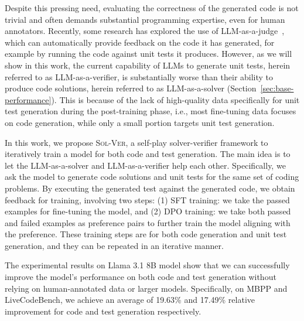 Despite this pressing need, evaluating the correctness of the generated code is not trivial and often demands substantial programming expertise, even for human annotators.
Recently, some research has explored the use of LLM-as-a-judge~\cite{mcaleese2024llm,alshahwan2024automated,dong2024self}, which can automatically provide feedback on the code it has generated, for example by running the code against unit tests it produces. However, as we will show in this work, the current capability of LLMs to generate unit tests, herein referred to as LLM-as-a-verifier, is substantially worse than their ability to produce code solutions, herein referred to as LLM-as-a-solver (Section~\ref{sec:base-performance}). This is because of the lack of high-quality data specifically for unit test generation during the post-training phase, i.e., most fine-tuning data focuses on code generation, while only a small portion targets unit test generation.


In this work, we propose \textsc{Sol-Ver}, a self-play solver-verifier framework to iteratively train a model for both code and test generation. The main idea is to let the LLM-as-a-solver and LLM-as-a-verifier help each other. Specifically, we ask the model to generate code solutions and unit tests for the same set of coding problems. By  executing the generated test against the generated code, we obtain feedback for training, involving two steps: (1) SFT training: we take the passed examples for fine-tuning the model, and (2) DPO training: we take both passed and failed examples as preference pairs to further train the model aligning with the preference. These training steps are for both code generation and unit test generation, and they can be repeated in an iterative manner. 

The experimental results on Llama 3.1 8B model show that we can successfully improve the model’s performance on both code and test generation without relying on human-annotated data or larger models. Specifically, on MBPP and LiveCodeBench, we achieve an average of 19.63\% and 17.49\% relative improvement for code and test generation respectively.

